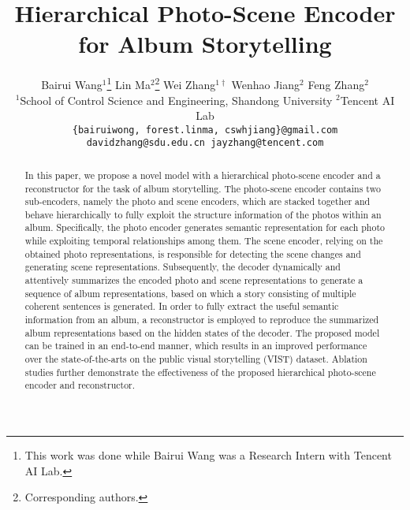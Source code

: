 \documentclass[letterpaper]{article} \usepackage{aaai19}  \usepackage{times}  \usepackage{helvet}  \usepackage{courier}  \usepackage{url}  \usepackage{graphicx}  \usepackage{color}
\begin{document}
\title{Hierarchical Photo-Scene Encoder for Album Storytelling} \author{Bairui Wang$^1$\thanks{This work was done while Bairui Wang was a Research Intern with Tencent AI Lab.} \qquad Lin Ma$^2$\thanks{Corresponding authors.} \qquad Wei Zhang$^{1\dagger}$ \qquad Wenhao Jiang$^2$ \qquad Feng Zhang$^2$  \\
$^1$School of Control Science and Engineering, Shandong University \qquad $^2$Tencent AI Lab  \\
{\tt\small\{bairuiwong, forest.linma, cswhjiang\}@gmail.com} \\
{\tt\small davidzhang@sdu.edu.cn \qquad jayzhang@tencent.com}
}
\maketitle
\begin{abstract}

In this paper, we propose a novel model with a hierarchical photo-scene encoder and a reconstructor for the task of album storytelling. The photo-scene encoder contains two sub-encoders, namely the photo and scene encoders, which are stacked together and behave hierarchically to fully exploit the structure information of the photos within an album. Specifically, the photo encoder generates semantic representation for each photo while  exploiting temporal relationships among them. The scene encoder, relying on the obtained photo representations, is responsible for detecting the scene changes and generating scene representations. Subsequently, the decoder dynamically and attentively summarizes the encoded photo and scene representations to generate a sequence of album representations, based on which a story consisting of multiple coherent sentences is generated. In order to fully extract the useful semantic information from an album, a reconstructor is employed to reproduce the summarized album representations based on the hidden states of the decoder. The proposed model can be trained in an end-to-end manner, which results in an improved performance over the state-of-the-arts on the public visual storytelling (VIST) dataset. Ablation studies further demonstrate the effectiveness of the proposed hierarchical photo-scene encoder and reconstructor.



\end{abstract}
\end{document}

